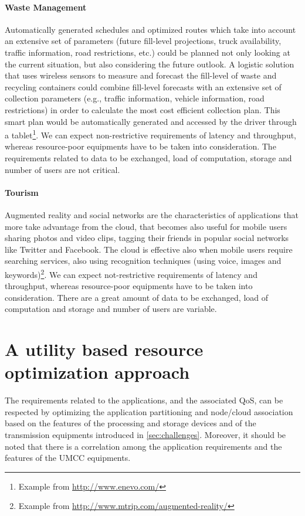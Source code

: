 \documentclass[twoside,openright]{report}
\begin{document}
\paragraph{Waste Management}
Automatically generated schedules and optimized routes which take into account an extensive set of parameters (future fill-level projections, truck availability, traffic information, road restrictions, etc.) could be planned not only looking at the current situation, but also considering the future outlook. 
A logistic solution that uses wireless sensors to measure and forecast the fill-level of waste and recycling containers could combine fill-level forecasts with an extensive set of collection parameters (e.g., traffic information, vehicle information, road restrictions) in order to calculate the most cost efficient collection plan. 
This smart plan would be automatically generated and accessed by the driver through a tablet\footnote{Example from \url{http://www.enevo.com/}}. 
We can expect non-restrictive requirements of latency and throughput, whereas  resource-poor equipments have to be taken into consideration. 
The requirements related to data to be exchanged, load of computation, storage and number of users are not critical.

\paragraph{Tourism}
Augmented reality and social networks are the characteristics of applications that more take advantage from the cloud, that becomes also useful for mobile users sharing photos and video clips, tagging their friends in popular social networks like Twitter and Facebook. 
The cloud is effective also when mobile users require searching services, also using recognition techniques (using voice, images and keywords)\footnote{Example from \url{http://www.mtrip.com/augmented-reality/}}. 
We can expect not-restrictive requirements of latency and throughput, whereas  resource-poor equipments have to be taken into consideration. 
There are a great amount of data to be exchanged, load of computation and storage and number of users are variable.

\section{A utility based resource optimization approach}
\label{sec:cost}
The requirements related to the applications, and the associated \gls{QoS}, can be respected by optimizing the application partitioning and node/cloud association based on the features of the processing and storage devices and of the transmission equipments introduced in \autoref{sec:challenges}. Moreover, it should be noted that there is a correlation among the application requirements and the features of the \gls{UMCC} equipments. 
\end{document}
